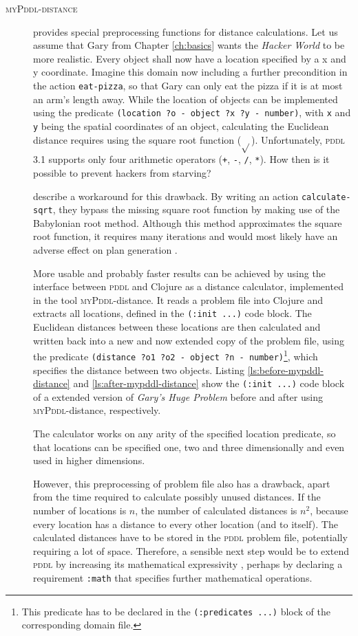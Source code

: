 \documentclass[runningheads]{llncs}
\newcommand{\mypddl}{\textsc{myPddl}\xspace}
\newcommand{\mypddldistance}{\textsc{myPddl-distance}\xspace}
\newcommand{\pddl}{\textsc{pddl}\xspace}
\begin{document}
\begin{description}
\item[\mypddldistance] provides special preprocessing functions for
  distance calculations. Let us assume that Gary from Chapter \ref{ch:basics} wants the
\emph{Hacker World} to be more realistic. Every object shall now have
a location specified by a x and y coordinate. Imagine this domain now
including a further precondition in the action \texttt{eat-pizza}, so
that Gary can only eat the pizza if it is at most an arm's length
away. While the location of objects can be implemented using the
predicate \texttt{(location ?o - object ?x ?y - number)}, with
\texttt{x} and \texttt{y} being the spatial coordinates of an object,
calculating the Euclidean distance requires using the square root
function ($\sqrt{}$). Unfortunately, \pddl 3.1 supports only four
arithmetic operators (\texttt{+}, \texttt{-}, \texttt{/}, \texttt{*}).
How then is it possible to prevent hackers from starving?

\cite{parkinson2012increasing} describe a workaround for this
drawback. By writing an action \texttt{calculate-sqrt}, they bypass
the missing square root function by making use of the Babylonian root
method. Although this method approximates the square root function, it
requires many iterations and would most likely have an adverse effect
on plan generation \cite{parkinson2012increasing}.

More usable and probably faster results can be achieved by using the
interface between \pddl and Clojure as a distance calculator,
implemented in the tool \mypddl-distance. It reads a problem file into
Clojure and extracts all locations, defined in the \texttt{(:init
  ...)} code block. The Euclidean distances between these locations
are then calculated and written back into a new and now extended copy
of the problem file, using the predicate
\texttt{(distance~?o1~?o2~-~object ?n~-~number)}\footnote{This
  predicate has to be declared in the \texttt{(:predicates ...)} block
  of the corresponding domain file.}, which specifies the distance
between two objects. Listing \ref{ls:before-mypddl-distance} and
\ref{ls:after-mypddl-distance} show the \texttt{(:init ...)} code
block of a extended version of \emph{Gary's Huge Problem} before and
after using \mypddl-distance, respectively.

The calculator works on any arity of the specified location predicate,
so that locations can be specified one, two and three dimensionally
and even used in higher dimensions.

However, this preprocessing of problem file also has a drawback, apart
from the time required to calculate possibly unused distances. If the
number of locations is \(n\), the number of calculated distances is
\(n^2\), because every location has a distance to every other location
(and to itself). The calculated distances have to be stored in the
\pddl problem file, potentially requiring a lot of space. Therefore, a
sensible next step would be to extend \pddl by increasing its
mathematical expressivity \cite{parkinson2012increasing}, perhaps by
declaring a requirement \texttt{:math} that specifies further
mathematical operations.


\end{description}
\end{document}
